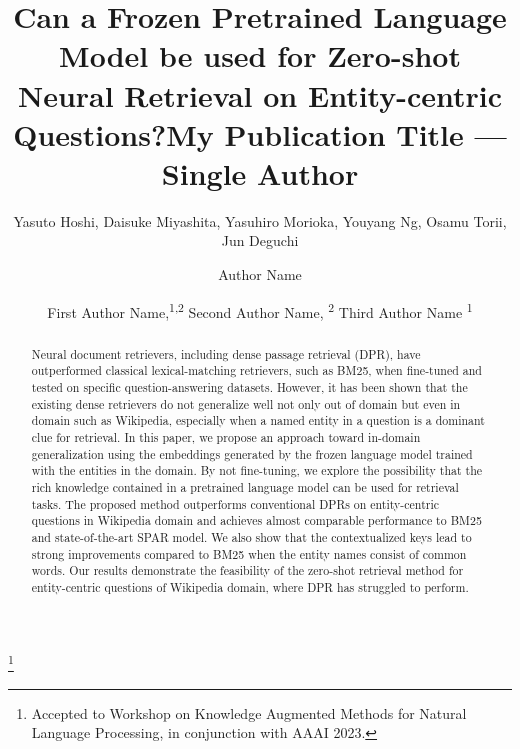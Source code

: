 \documentclass[letterpaper]{article} %
\title{Can a Frozen Pretrained Language Model be used for Zero-shot Neural Retrieval on Entity-centric Questions?}
\author{
    Yasuto Hoshi,
    Daisuke Miyashita,
    Yasuhiro Morioka,
    Youyang Ng,
    Osamu Torii,
    Jun Deguchi
    }
\title{My Publication Title --- Single Author}
\author {
    Author Name
}
\author {
    First Author Name,\textsuperscript{\rm 1,\rm 2}
    Second Author Name, \textsuperscript{\rm 2}
    Third Author Name \textsuperscript{\rm 1}
}
\newcommand\workshopnote[1]{\renewcommand\thefootnote{}\footnote{#1}}
\begin{document}
\maketitle

\begin{abstract}
	Neural document retrievers, including dense passage retrieval (DPR), have outperformed classical lexical-matching retrievers, such as BM25, when fine-tuned and tested on specific question-answering datasets.
	However, it has been shown that the existing dense retrievers do not generalize well not only out of domain but even in domain such as Wikipedia, especially when a named entity in a question is a dominant clue for retrieval.
	In this paper, we propose an approach toward in-domain generalization using the embeddings generated by the frozen language model trained with the entities in the domain.
	By not fine-tuning, we explore the possibility that the rich knowledge contained in a pretrained language model can be used for retrieval tasks.
	The proposed method outperforms conventional DPRs on entity-centric questions in Wikipedia domain and achieves almost comparable performance to BM25 and state-of-the-art SPAR model.
	We also show that the contextualized keys lead to strong improvements compared to BM25 when the entity names consist of common words.
	Our results demonstrate the feasibility of the zero-shot retrieval method for entity-centric questions of Wikipedia domain, where DPR has struggled to perform.
\end{abstract}

\workshopnote{Accepted to Workshop on Knowledge Augmented Methods for Natural Language Processing, in conjunction with AAAI 2023.}

\renewcommand{\thefootnote}{\arabic{footnote}}

\end{document}

